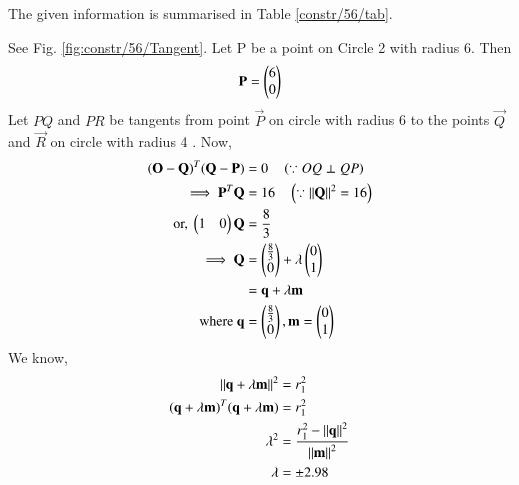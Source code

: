 The given information is summarised in Table \ref{constr/56/tab}.
\begin{table}[!ht]
\begin{center}
\end{center}
\caption{}
\label{constr/56/tab}
\end{table}
See Fig. \ref{fig:constr/56/Tangent}. Let P be a point on Circle 2 with radius 6.  Then 
\begin{align}
\mathbf{P} = \begin{pmatrix}6\\0\end{pmatrix}
\end{align}
Let $PQ$ and $PR$  be tangents from point $\vec{P}$ on circle with radius 6 to the points $\vec{Q}$ and $\vec{R}$ on circle with radius 4 .
Now,
\begin{align}
(\mathbf{O}-\mathbf{Q})^T (\mathbf{Q}-\mathbf{P}) &= 0 \quad \left(\because OQ \perp QP \right)
\\
\implies \mathbf{P}^T \mathbf{Q} &= 16 \quad \left(\because \left\lVert\mathbf{Q}\right\rVert^2 = 16\right)
\\
\text{or, }\begin{pmatrix}1&0\end{pmatrix} \mathbf{Q} &= \frac{8}{3}
\\
\implies \mathbf{Q} &= \begin{pmatrix}\frac{8}{3}\\0\end{pmatrix} + \lambda \begin{pmatrix}0\\1\end{pmatrix} \label{constr/56/2.0.11} 
\\
&=\mathbf{q}+\lambda\mathbf{m}
\\
\text{where }\mathbf{q}&=\begin{pmatrix}\frac{8}{3}\\ 0\end{pmatrix},\mathbf{m}=\begin{pmatrix}0\\1\end{pmatrix}
\end{align}
We know,
\begin{align}
\left\lVert\mathbf{q}+\lambda\mathbf{m}\right\rVert^2&=r_1^2
\\
(\mathbf{q}+\lambda \mathbf{m})^T(\mathbf{q}+\lambda \mathbf{m})&=r_1^2
\\
\lambda^2&=\frac{r_1^2-\left\lVert\mathbf{q}\right\rVert^2}{\left\lVert\mathbf{m}\right\rVert^2}
\\
\lambda &= \pm 2.98
\end{align}

